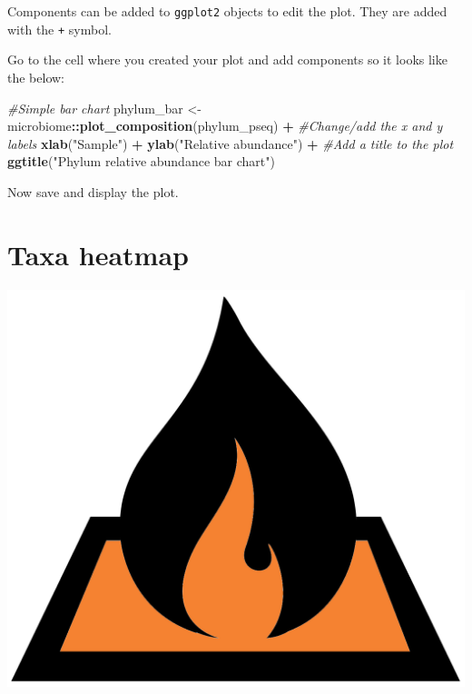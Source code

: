 \documentclass[
]{book}
\newenvironment{Shaded}{\begin{snugshade}}{\end{snugshade}}
\newcommand{\CommentTok}[1]{\textcolor[rgb]{0.56,0.35,0.01}{\textit{#1}}}
\newcommand{\FunctionTok}[1]{\textcolor[rgb]{0.13,0.29,0.53}{\textbf{#1}}}
\newcommand{\NormalTok}[1]{#1}
\newcommand{\OtherTok}[1]{\textcolor[rgb]{0.56,0.35,0.01}{#1}}
\newcommand{\SpecialCharTok}[1]{\textcolor[rgb]{0.81,0.36,0.00}{\textbf{#1}}}
\newcommand{\StringTok}[1]{\textcolor[rgb]{0.31,0.60,0.02}{#1}}
\begin{document}
Components can be added to \texttt{ggplot2} objects to edit the plot.
They are added with the \texttt{+} symbol.

Go to the cell where you created your plot and add components so it looks like the below:

\begin{Shaded}
\begin{Highlighting}[]
\CommentTok{\#Simple bar chart}
\NormalTok{phylum\_bar }\OtherTok{\textless{}{-}}\NormalTok{ microbiome}\SpecialCharTok{::}\FunctionTok{plot\_composition}\NormalTok{(phylum\_pseq) }\SpecialCharTok{+}
  \CommentTok{\#Change/add the x and y labels}
  \FunctionTok{xlab}\NormalTok{(}\StringTok{"Sample"}\NormalTok{) }\SpecialCharTok{+} \FunctionTok{ylab}\NormalTok{(}\StringTok{"Relative abundance"}\NormalTok{) }\SpecialCharTok{+}
  \CommentTok{\#Add a title to the plot}
  \FunctionTok{ggtitle}\NormalTok{(}\StringTok{"Phylum relative abundance bar chart"}\NormalTok{)}
\end{Highlighting}
\end{Shaded}

Now save and display the plot.

\hypertarget{taxa-heatmap}{%
\section{Taxa heatmap}\label{taxa-heatmap}}

\includegraphics{figures/heatmap.png}
\end{document}
